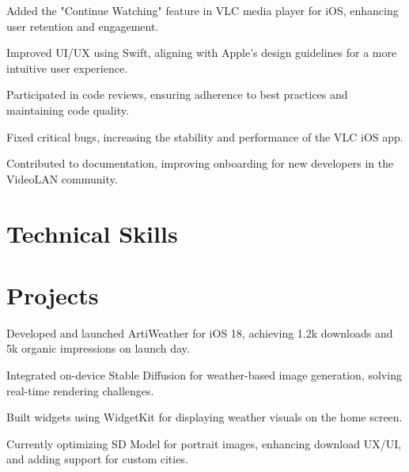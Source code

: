 \documentclass[]{deedy-resume-openfont}
\begin{document}
\textbf{\href{https://summerofcode.withgoogle.com/projects/6623823417311232}{}} 
\begin{tightemize}
    \item Added the "Continue Watching" feature in VLC media player for iOS, enhancing user retention and engagement.
    \item Improved UI/UX using Swift, aligning with Apple's design guidelines for a more intuitive user experience.
    \item Participated in code reviews, ensuring adherence to best practices and maintaining code quality.
    \item Fixed critical bugs, increasing the stability and performance of the VLC iOS app.
    \item Contributed to documentation, improving onboarding for new developers in the VideoLAN community.
\end{tightemize}


\section{Technical Skills }


\section{Projects}

\textbf{\href{https://apps.apple.com/app/artiweather/id6446815662}{}} 
\begin{tightemize}
    \item Developed and launched ArtiWeather for iOS 18, achieving 1.2k downloads and 5k organic impressions on launch day.
    \item Integrated on-device Stable Diffusion for weather-based image generation, solving real-time rendering challenges.
    \item Built widgets using WidgetKit for displaying weather visuals on the home screen.
    \item Currently optimizing SD Model for portrait images, enhancing download UX/UI, and adding support for custom cities.
\end{tightemize}
\sectionsep
\end{document}
